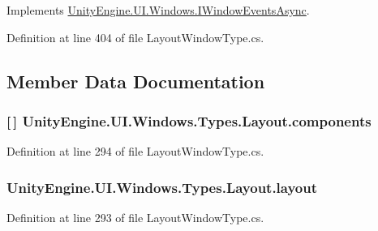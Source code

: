 Implements \hyperlink{interface_unity_engine_1_1_u_i_1_1_windows_1_1_i_window_events_async_a4cd2bac250f3edfedfd43fbb0bca2a3c}{Unity\+Engine.\+U\+I.\+Windows.\+I\+Window\+Events\+Async}.



Definition at line 404 of file Layout\+Window\+Type.\+cs.



\subsection{Member Data Documentation}
\hypertarget{class_unity_engine_1_1_u_i_1_1_windows_1_1_types_1_1_layout_afd821bb2d6a05114faafa4a05099410f}{}
\subsubsection[{components}]{ \mbox{[}$\,$\mbox{]} Unity\+Engine.\+U\+I.\+Windows.\+Types.\+Layout.\+components}\label{class_unity_engine_1_1_u_i_1_1_windows_1_1_types_1_1_layout_afd821bb2d6a05114faafa4a05099410f}


Definition at line 294 of file Layout\+Window\+Type.\+cs.

\hypertarget{class_unity_engine_1_1_u_i_1_1_windows_1_1_types_1_1_layout_a56d39baaf051959b4a7c5b3cced14c79}{}
\subsubsection[{layout}]{ Unity\+Engine.\+U\+I.\+Windows.\+Types.\+Layout.\+layout}\label{class_unity_engine_1_1_u_i_1_1_windows_1_1_types_1_1_layout_a56d39baaf051959b4a7c5b3cced14c79}


Definition at line 293 of file Layout\+Window\+Type.\+cs.

\hypertarget{class_unity_engine_1_1_u_i_1_1_windows_1_1_types_1_1_layout_a0bbeabcabbf50cf8525e70db2a840c1a}{}
